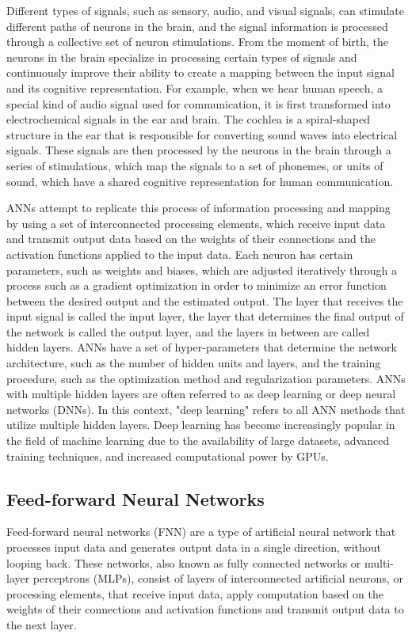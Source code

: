 Different types of signals, such as sensory, audio, and visual signals, can stimulate different paths of neurons in the brain, and the signal information is processed through a collective set of neuron stimulations. From the moment of birth, the neurons in the brain specialize in processing certain types of signals and continuously improve their ability to create a mapping between the input signal and its cognitive representation. For example, when we hear human speech, a special kind of audio signal used for communication, it is first transformed into electrochemical signals in the ear and brain. The cochlea is a spiral-shaped structure in the ear that is responsible for converting sound waves into electrical signals. These signals are then processed by the neurons in the brain through a series of stimulations, which map the signals to a set of phonemes, or units of sound, which have a shared cognitive representation for human communication.

ANNs attempt to replicate this process of information processing and mapping by using a set of interconnected processing elements, which receive input data and transmit output data based on the weights of their connections and the activation functions applied to the input data. 
Each neuron has certain parameters, such as weights and biases, which are adjusted iteratively through a process such as a gradient optimization in order to minimize an error function between the desired output and the estimated output. The layer that receives the input signal is called the input layer, the layer that determines the final output of the network is called the output layer, and the layers in between are called hidden layers. ANNs have a set of hyper-parameters that determine the network architecture, such as the number of hidden units and layers, and the training procedure, such as the optimization method and regularization parameters. ANNs with multiple hidden layers are often referred to as deep learning or deep neural networks (DNNs). In this context, "deep learning" refers to all ANN methods that utilize multiple hidden layers. Deep learning has become increasingly popular in the field of machine learning due to the availability of large datasets, advanced training techniques, and increased computational power by GPUs.


\subsection{Feed-forward Neural Networks} 
Feed-forward neural networks (FNN) are a type of artificial neural network that processes input data and generates output data in a single direction, without looping back. These networks, also known as fully connected networks or multi-layer perceptrons (MLPs), consist of layers of interconnected artificial neurons, or processing elements, that receive input data, apply computation based on the weights of their connections and activation functions and transmit output data to the next layer.


